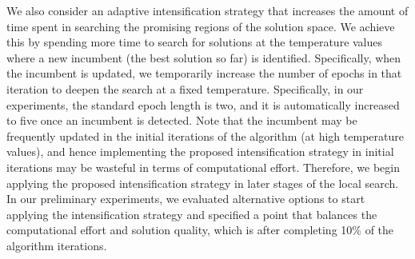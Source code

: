 \documentclass[11pt]{article}
\begin{document}
We also consider an adaptive intensification strategy that increases the amount of time spent in searching the promising regions of the solution space. We achieve this by spending more time to search for solutions at the temperature values where a new incumbent (the best solution so far) is identified. Specifically, when the incumbent is updated, we temporarily increase the number of epochs in that iteration to deepen the search at a fixed temperature. Specifically, in our experiments, the standard epoch length is two, and it is automatically increased to five once an incumbent is detected. Note that the incumbent may be frequently updated in the initial iterations of the algorithm (at high temperature values), and hence implementing the proposed intensification strategy in initial iterations may be wasteful in terms of computational effort. Therefore, we begin applying the proposed intensification strategy in later stages of the local search. In our preliminary experiments, we evaluated alternative options to start applying the intensification strategy and specified a point that balances the computational effort and solution quality, which is after completing 10\% of the algorithm iterations.






\end{document}
